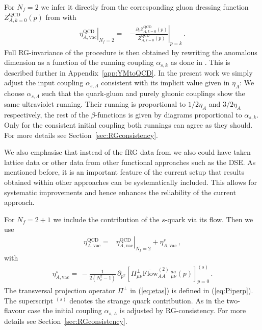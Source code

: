 \documentclass[%
reprint,
superscriptaddress,
showpacs,preprintnumbers,
 amsmath,amssymb,
 aps,
prd,
]{revtex4-1}
\def\eq#1{(\ref{#1})}
\def\sec#1{Section~\ref{#1}}
\def\app#1{Appendix~\ref{#1}}
\begin{document}
For $N_f=2$ we infer it directly from the corresponding gluon dressing
function $Z^\textrm{QCD}_{A,k=0}(p)$ from \cite{Cyrol:2017ewj} with
%
\begin{align}
  \left.\eta_{A,\textrm{vac}}^{\text{QCD}}\right|_{N_f=2}=
  &-\left. \frac{\partial_t
    Z^{\text{QCD}}_{A, k=0}(p)}{
    Z^{\text{QCD}}_{A, k=0}(p)}\right|_{p=k}\,.
                                                   \label{eq:etaAQCD2}
\end{align}
%
Full RG-invariance of the procedure is then obtained by rewriting the
anomalous dimension as a function of the running coupling
$\alpha_{s,k}$ as done in \cite{Braun:2014ata,Rennecke:2015}. This is
described further in \app{app:YMtoQCD}. In the present work we simply
adjust the input coupling $\alpha_{s,\Lambda}$ consistent with its
implicit value given in $\eta_A$: We choose $\alpha_{s,\Lambda}$ such
that the quark-gluon and purely gluonic couplings show the same
ultraviolet running. Their running is proportional to $1/2 \eta_A$ and
$3/2 \eta_A$ respectively, the rest of the $\beta$-functions is given
by diagrams proportional to $\alpha_{s,k}$. Only for the consistent
initial coupling both runnings can agree as they should. For more
details see \sec{sec:RGconsistency}.

We also emphasise that instead of the fRG data from
\cite{Cyrol:2017ewj} we also could have taken lattice data or other
data from other functional approaches such as the DSE. As mentioned
before, it is an important feature of the current setup that results
obtained within other approaches can be systematically included. This
allows for systematic improvements and hence enhances the reliability
of the current approach.

For $N_f=2+1$ we include the contribution of the $s$-quark via its
flow. Then we use
%
\begin{align}
  \eta_{A,\textrm{vac}}^{\text{QCD}}=
  &\left.
    \eta_{A,\textrm{vac}}^{\text{QCD}}\right|_{N_f=2}+
    \eta^s_{A,\textrm{vac}}\,,\label{eq:etaAQCD2+1}
\end{align}
%
with
%
\begin{align}
  \eta^s_{A,\textrm{vac}}=\, -\frac{1}{2 (N_c^2-1)}
  \,\partial_{p^2}\left[\Pi_{\mu\nu}^{\perp}\overline{{
  \textrm{Flow}}}^{(2)}_{AA}{\,}^{aa}_{\mu\nu}(p)
  \right]^{(s)}_{p=0}\,.\label{eq:etas}
\end{align}
%
The transversal projection operator $\Pi^\perp$ in \eq{eq:etas} is
defined in \eq{eq:Piperp}. The superscript $^{(s)}$ denotes the
strange quark contribution. As in the two-flavour case the initial
coupling $\alpha_{s,\Lambda}$ is adjusted by RG-consistency. For more
details see \sec{sec:RGconsistency}.
\end{document}
